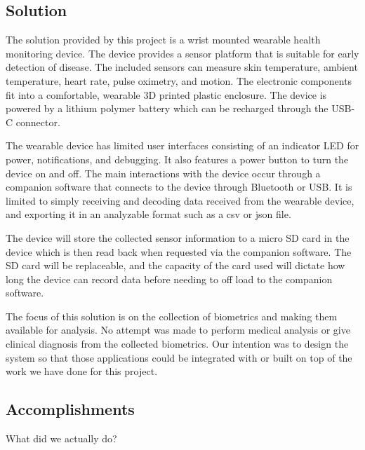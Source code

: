 \subsection{Solution}

The solution provided by this project is a wrist mounted wearable health 
monitoring device. The device provides a sensor platform that is suitable for 
early detection of disease. The included sensors can measure skin temperature, 
ambient temperature, heart rate, pulse oximetry, and motion.  The electronic
components fit into a comfortable, wearable 3D printed plastic enclosure.
The device is powered by a lithium polymer battery which can be recharged
through the USB-C connector.

The wearable device has limited user interfaces consisting of an indicator
LED for power, notifications, and debugging. It also features a power button
to turn the device on and off. The main interactions with the device occur 
through a companion software that connects to the device through Bluetooth or 
USB. It is limited to simply receiving and decoding data received from the 
wearable device, and exporting it in an analyzable format such as a csv or json 
file.

The device will store the collected sensor information to a micro SD card
in the device which is then read back when requested via the companion software.
The SD card will be replaceable, and the capacity of the card used will dictate
how long the device can record data before needing to off load to the companion
software.

The focus of this solution is on the collection of biometrics and making them
available for analysis. No attempt was made to perform medical analysis
or give clinical diagnosis from the collected biometrics. Our intention was to
design the system so that those applications could be integrated with or built
on top of the work we have done for this project.

\subsection{Accomplishments}
{\color{red}
What did we actually do?
}


